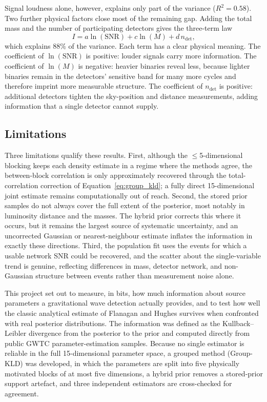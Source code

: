 \documentclass{phys400finalreport}
\begin{document}
Signal loudness alone, however, explains only part of the variance
($R^2 = 0.58$). Two further physical factors close most of the remaining gap.
Adding the total mass and the number of participating detectors gives the
three-term law
\begin{equation}
I = a\ln(\mathrm{SNR}) + c\ln(M) + d\,n_\mathrm{det},
\label{eq:fulllaw}
\end{equation}
which explains $88\%$ of the variance. Each term has a clear physical meaning.
The coefficient of $\ln(\mathrm{SNR})$ is positive: louder signals carry more
information. The coefficient of $\ln(M)$ is negative: heavier binaries reveal
less, because lighter binaries remain in the detectors' sensitive band for many
more cycles and therefore imprint more measurable structure. The coefficient of
$n_\mathrm{det}$ is positive: additional detectors tighten the sky-position and
distance measurements, adding information that a single detector cannot supply.

\subsection*{Limitations}

Three limitations qualify these results. First, although the $\leq$5-dimensional
blocking keeps each density estimate in a regime where the methods agree, the
between-block correlation is only approximately recovered through the
total-correlation correction of Equation~\ref{eq:group_kld}; a fully direct
15-dimensional joint estimate remains computationally out of reach. Second, the
stored prior samples do not always cover the full extent of the posterior,
most notably in luminosity distance and the masses. The hybrid prior corrects
this where it occurs, but it remains the largest source of systematic
uncertainty, and an uncorrected Gaussian or nearest-neighbour estimate inflates
the information in exactly these directions. Third, the population fit uses the
events for which a usable network SNR could be recovered, and the scatter about
the single-variable trend is genuine, reflecting differences in mass, detector
network, and non-Gaussian structure between events rather than measurement
noise alone.

\conclusion\label{sec:conclusion}

This project set out to measure, in bits, how much information about source
parameters a gravitational wave detection actually provides, and to test how
well the classic analytical estimate of Flanagan and Hughes survives when
confronted with real posterior distributions. The information was defined as
the Kullback--Leibler divergence from the posterior to the prior and computed
directly from public GWTC parameter-estimation samples. Because no single
estimator is reliable in the full 15-dimensional parameter space, a grouped
method (Group-KLD) was developed, in which the parameters are split into five
physically motivated blocks of at most five dimensions, a hybrid prior removes a
stored-prior support artefact, and three independent estimators are
cross-checked for agreement.
\end{document}
